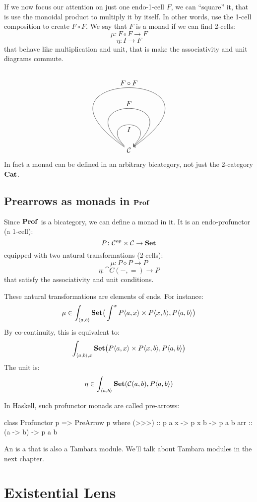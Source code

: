 \documentclass[DaoFP]{subfiles}
\begin{document}
If we now focus our attention on just one endo-1-cell $F$, we can ``square'' it, that is use the monoidal product to multiply it by itself. In other words, use the 1-cell composition to create $F \circ F$. We say that $F$ is a monad if we can find 2-cells:
\[ \mu \colon F \circ F \to F \]
\[ \eta \colon I \to F \]
that behave like multiplication and unit, that is make the associativity and unit diagrams commute. 
\[
   \begin{tikzpicture}
        \node [] (star) {$\cat C$} ;
        \path[->,draw] (star) to  [in=45,out=135, loop,distance=2cm] node[ below] {$I$} (star);
        \path[->,draw] (star) to  [in=40,out=140, loop,distance=4cm] node[above] {$F$} (star);
        \path[->,draw] (star) to  [ in=35,out=145, loop,distance=7cm] node[auto] {$F \circ F$} (star);
    \end{tikzpicture}
\]
In fact a monad can be defined in an arbitrary bicategory, not just the 2-category $\mathbf{Cat}$. 

\subsection{Prearrows as monads in $\mathbf{Prof}$}

Since $\mathbf{Prof}$ is a bicategory, we can define a monad in it. It is an endo-profunctor (a 1-cell):
\[ P \colon \mathcal{C}^{op} \times \mathcal{C} \to \mathbf{Set} \]
equipped with two natural transformations (2-cells):
\[ \mu \colon P \diamond P \to P \]
\[ \eta \colon \cat C(-, =) \to P \]
that satisfy the associativity and unit conditions.

These natural transformations are elements of ends. For instance:
\[ \mu \in \int_{\langle a, b \rangle} \mathbf{Set} \big( \int^x P \langle a, x \rangle \times P \langle x, b \rangle,  P\langle a, b \rangle \big) \]
By co-continuity, this is equivalent to:
\[ \int_{\langle a, b \rangle, x} \mathbf{Set} \big(P \langle a, x \rangle \times P \langle x, b \rangle,  P\langle a, b \rangle \big) \]
The unit is:
\[ \eta \in \int_{\langle a, b \rangle} \mathbf{Set} (\mathcal{C}(a, b), P\langle a, b \rangle) \]

In Haskell, such profunctor monads are called pre-arrows:
\begin{haskell}
class Profunctor p => PreArrow p where
  (>>>) :: p a x -> p x b -> p a b
  arr   :: (a -> b) -> p a b
\end{haskell}
An  is a  that is also a Tambara module. We'll talk about Tambara modules in the next chapter.

\section{Existential Lens}
\end{document}
